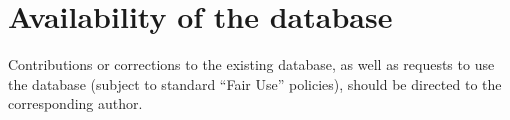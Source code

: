 \documentclass[letterpaper,12pt]{article}
\begin{document}




\newpage

\section*{Availability of the database} 
Contributions or corrections to the existing database, as well as
requests to use the database (subject to standard ``Fair Use''
policies), should be directed to the corresponding author. 
\end{document}
